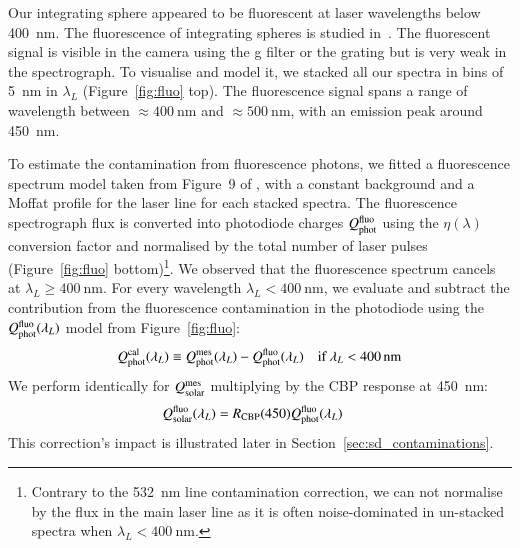 Our integrating sphere appeared to be fluorescent at laser wavelengths below \SI{400}{\nano\meter}. The fluorescence of integrating spheres is studied in~\cite{shaw2007ultraviolet}. The fluorescent signal is visible in the \SD camera using the g filter or the grating but is very weak in the spectrograph. To visualise and model it, we stacked all our spectra in bins of \SI{5}{\nano\meter} in $\lambda_L$ (Figure~\ref{fig:fluo} top). The fluorescence signal spans a range of wavelength between $\approx \SI{400}{\nano\meter}$ and $\approx\SI{500}{\nano\meter}$, with an emission peak around \SI{450}{\nano\meter}. %

To estimate the contamination from fluorescence photons, we fitted a fluorescence spectrum model taken from Figure~9 of \cite{shaw2007ultraviolet}, with a constant background and a Moffat profile for the laser line for each stacked spectra. The fluorescence spectrograph flux is converted into photodiode charges $Q_{\mathrm{phot}}^{\mathrm{fluo}}$ using the $\eta(\lambda)$ conversion factor and normalised by the total number of laser pulses (Figure~\ref{fig:fluo} bottom)\footnote{Contrary to the \SI{532}{\nano\meter} line contamination correction, we can not normalise by the flux in the main laser line as it is often noise-dominated in un-stacked spectra when $\lambda_L < \SI{400}{\nano\meter}$.}. We observed that the fluorescence spectrum cancels at $\lambda_L \geq \SI{400}{\nano\meter}$. For every wavelength $\lambda_L < \SI{400}{\nano\meter}$, we evaluate and subtract the contribution from the fluorescence contamination in the photodiode using the $Q_{\mathrm{phot}}^{\mathrm{fluo}}(\lambda_L)$ model from Figure~\ref{fig:fluo}:
\begin{equation}
        Q_{\mathrm{phot}}^{\mathrm{cal}}(\lambda_L) \equiv  Q_{\mathrm{phot}}^{\mathrm{mes}}(\lambda_L) - Q_{\mathrm{phot}}^{\mathrm{fluo}}(\lambda_L) \quad\text{if}\ \lambda_L < \SI{400}{\nano\meter}
        \label{eq:qphot_calfluo}
\end{equation}
We perform identically for $Q_{\mathrm{solar}}^{\mathrm{mes}}$ multiplying by the CBP response at \SI{450}{\nano\meter}: 
\begin{equation}
\begin{aligned}
    Q_{\mathrm{solar}}^{\rm fluo}(\lambda_L) & = R_{\mathrm{CBP}}(450)  Q_{\mathrm{phot}}^{\rm fluo}(\lambda_L)
    \label{eq:qsolar_calfluo}
\end{aligned}
\end{equation}
This correction's impact is illustrated later in Section~\ref{sec:sd_contaminations}.

